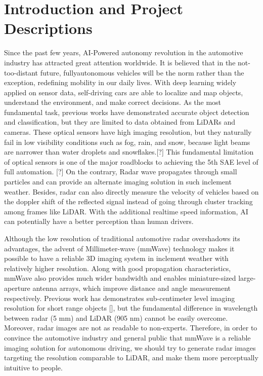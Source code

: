 \section{Introduction and Project Descriptions}


Since the past few years, AI-Powered autonomy revolution in the automotive industry has attracted great attention worldwide. It is believed that in the not-too-distant future, fullyautonomous vehicles will be the norm rather than the exception, redefining mobility in our daily lives. With deep learning widely applied on sensor data, self-driving cars are able to localize and map objects, understand the environment, and make correct decisions. As the most fundamental task, previous works have demonstrated accurate object detection and classification, but they are limited to data obtained from LiDARs and cameras. These optical sensors have high imaging resolution, but they naturally fail in low visibility conditions such as fog, rain, and snow, because light beams are narrower than water droplets and snowflakes.[?] This fundamental limitation of optical sensors is one of the major roadblocks to achieving the 5th SAE level of full automation. [?] On the contrary, Radar wave propagates through small particles and can provide an alternate imaging solution in such inclement weather. Besides, radar can also directly measure the velocity of vehicles based on the doppler shift of the reflected signal instead of going through cluster tracking among frames like LiDAR. With the additional realtime speed information, AI can potentially have a better perception than human drivers.

Although the low resolution of traditional automotive radar overshadows its advantages, the advent of Millimeter-wave (mmWave) technology makes it possible to have a reliable 3D imaging system in inclement weather with relatively higher resolution. Along with good propagation characteristics, mmWave also provides much wider bandwidth and enables miniature-sized large-aperture antenna arrays, which improve distance and angle measurement respectively. Previous work has demonstrates sub-centimeter level imaging resolution for short range objects [], but the fundamental difference in wavelength between radar (5 mm) and LiDAR (905 nm) cannot be easily overcome. Moreover, radar images are not as readable to non-experts. Therefore, in order to convince the automotive industry and general public that mmWave is a reliable imaging solution for autonomous driving, we should try to generate radar images targeting the resolution comparable to LiDAR, and make them more perceptually intuitive to people. 

